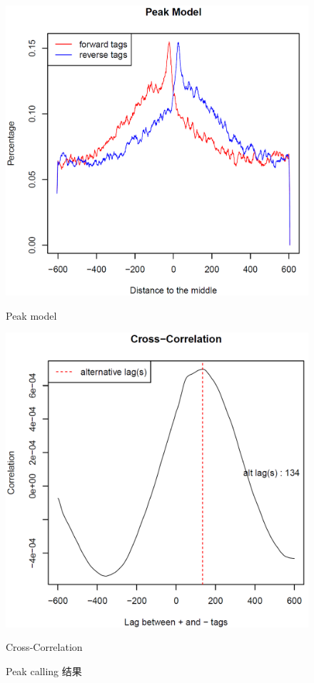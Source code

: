 \documentclass[UTF8]{ctexart}
\begin{document}
\begin{figure}[h]
	\begin{minipage}{0.45\linewidth}
		\centerline{\includegraphics[width=\textwidth]{img/peak_model.png}}
		\centerline{Peak model}
	\end{minipage}
	\begin{minipage}{0.45\linewidth}
		\centerline{\includegraphics[width=\textwidth]{img/cross_correlation.png}}
		\centerline{Cross-Correlation}
\end{minipage}

\caption{Peak calling 结果}
\end{figure}
\end{document}
